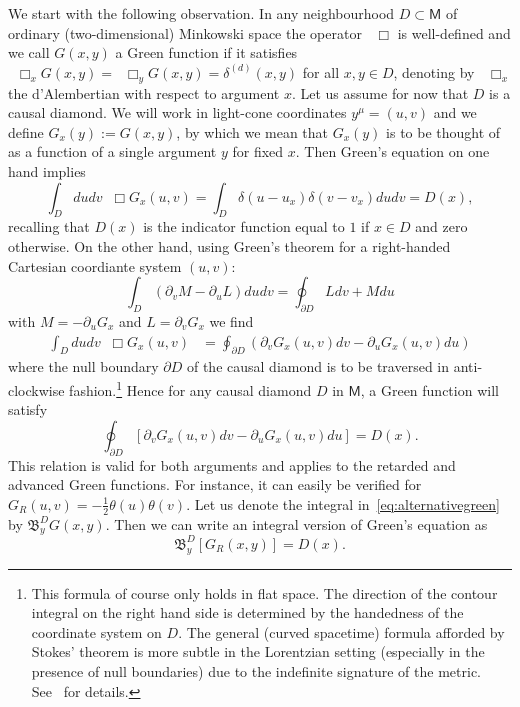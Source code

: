\documentclass[12pt]{article}
\newcommand{\be}{\begin{equation}}
\newcommand{\ee}{\end{equation}}
\newcommand*\dAlembert{\mathop{}\!\mathbin\Box}
\def\bea{\begin{equation}\begin{aligned}}
\def\eea{\end{aligned}\end{equation}}
\begin{document}
We start with the following observation. In any neighbourhood $D\subset\mathsf M$ of ordinary (two-dimensional) Minkowski space the operator $\dAlembert$ is well-defined and we call $G(x,y)$ a Green function if it satisfies $\dAlembert_x G(x,y) = \dAlembert_y G(x,y)= \delta^{(d)}(x,y)$ for all $x,y\in D$, denoting by $\dAlembert_x$ the d'Alembertian with respect to argument $x$. Let us assume for now that $D$ is a causal diamond. We will work in light-cone coordinates $y^\mu=(u,v)$ and we define $G_x(y):=G(x,y)$, by which we mean that $G_x(y)$ is to be thought of as a function of a single argument $y$ for fixed $x$. Then Green's equation on one hand implies
\be
\int_D dudv \dAlembert G_x(u,v)=\int_D \delta(u-u_x)\delta(v-v_x)dudv = D(x),
\ee
recalling that $D(x)$ is the indicator function equal to $1$ if $x\in D$ and zero otherwise. On the other hand, using Green's theorem for a right-handed Cartesian coordiante system $(u,v)$:
\be
\int_D \left(\partial_v M -\partial_u L\right)dudv = \oint_{\partial D} L dv + M du
\ee
with $M =-\partial_u G_x$ and $L=\partial_v G_x$ we find
\bea
\int_D dudv \dAlembert G_x(u,v)
&=\oint_{\partial D}\left(\partial_v G_x(u,v) dv -\partial_u G_x(u,v) du \right)
\eea
where the null boundary $\partial D$ of the causal diamond is to be traversed in anti-clockwise fashion.\footnote{
This formula of course only holds in flat space. The direction of the contour integral on the right hand side is determined by the handedness of the coordinate system on $D$. %
The general (curved spacetime) formula afforded by Stokes' theorem is more subtle in the Lorentzian setting (especially in the presence of null boundaries) due to the indefinite signature of the metric. See~\cite{sorkin:stokes,garcia1998divergence} for details.
}
Hence for any causal diamond $D$ in $\mathsf M$, a Green function will satisfy
\be
\label{eq:alternativegreen}
\oint_{\partial D}\left[\partial_v G_x(u,v) dv -\partial_u G_x(u,v) du \right] = D(x).
\ee
This relation is valid for both arguments and applies to the retarded and advanced Green functions. For instance, it can easily be verified for $G_R(u,v)=-\frac12 \theta(u)\theta(v)$. Let us denote the integral in~\eqref{eq:alternativegreen} by $\mathfrak B^{D}_y G(x,y)$. Then we can write an integral version of Green's equation as
\be
\mathfrak B ^D_y\left[G_R(x,y)\right]=D(x).
\label{eq:contour-op}
\ee
\end{document}
